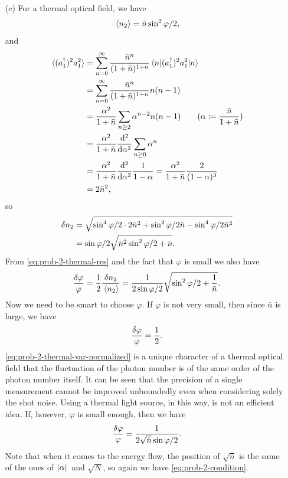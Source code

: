 \documentclass[hyperref, a4paper]{article}
\begin{document}
\begin{itemize}
\item[(c)] For a thermal optical field, we have 
\begin{equation}
    \expval*{n_2} = \bar{n} \sin^2 \varphi / 2,
    \label{eq:prob-2-thermal-res}
\end{equation}
and 
\[
    \begin{aligned}
        \expval*{(a_1^\dagger)^2 a_1^2} &= \sum_{n=0}^\infty \frac{\bar{n}^n}{(1 + \bar{n})^{1+n}} \expval*{(a_1^\dagger)^2 a_1^2}{n} \\
        &= \sum_{n=0}^\infty \frac{\bar{n}^n}{(1 + \bar{n})^{1+n}} n(n-1) \\
        &= \frac{\alpha^2}{1 + \bar{n}} \sum_{n \geq 2} \alpha^{n-2}  n(n-1)  \quad \quad (\alpha \coloneqq \frac{\bar{n}}{1 + \bar{n}}) \\
        &= \frac{\alpha^2}{1 + \bar{n}} \dv[2]{\alpha} \sum_{n \geq 0} \alpha^n \\
        &= \frac{\alpha^2}{1 + \bar{n}} \dv[2]{\alpha} \frac{1}{1 - \alpha} = \frac{\alpha^2}{1 + \bar{n}} \frac{2}{(1 - \alpha)^3} \\
        &= 2 \bar{n}^2,
    \end{aligned}
\]
so 
\begin{equation}
    \begin{aligned}
        \var{n_2} &= \sqrt{ \sin^4 \varphi / 2 \cdot 2 \bar{n}^2 + \sin^2 \varphi / 2 \bar{n} - \sin^4 \varphi / 2 \bar{n}^2 } \\
        &= \sin \varphi / 2 \sqrt{ \bar{n}^2 \sin^2 \varphi / 2 + \bar{n}}.
    \end{aligned}
    \label{eq:prob-2-thermal-var}
\end{equation}
From \eqref{eq:prob-2-thermal-res} and the fact that $\varphi$ is small we also have 
\[
    \frac{\var{\varphi}}{\varphi} = \frac{1}{2} \frac{\var{n_2}}{\expval*{n_2}} = \frac{1}{2 \sin \varphi / 2} \sqrt{\sin^2 \varphi / 2 + \frac{1}{\bar{n}}}.
\]
Now we need to be smart to choose $\varphi$. If $\varphi$ is not very small, then since $\bar{n}$ is large, we have 
\begin{equation}
    \frac{\var{\varphi}}{\varphi} = \frac{1}{2}.
    \label{eq:prob-2-thermal-var-normalized}
\end{equation}
\eqref{eq:prob-2-thermal-var-normalized} is a unique character of a thermal optical field that the fluctuation of 
the photon number is of the same order of the photon number itself. 
It can be seen that the precision of a single measurement cannot be improved unboundedly even when considering solely 
the shot noise. 
Using a thermal light source, in this way, is not an efficient idea.
If, however, $\varphi$ is small enough, then we have 
\begin{equation}
    \frac{\var{\varphi}}{\varphi} = \frac{1}{2 \sqrt{\bar{n}} \sin \varphi / 2}.
\end{equation}
Note that when it comes to the energy flow, the position of $\sqrt{\bar{n}}$ is the same of the ones of $\abs*{\alpha}$ and $\sqrt{N}$, so again we have \eqref{eq:prob-2-condition}.

\end{itemize}
\end{document}
